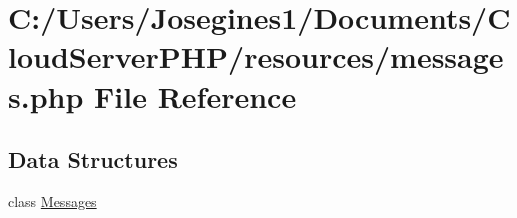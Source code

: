 \hypertarget{messages_8php}{}\section{C\+:/\+Users/\+Josegines1/\+Documents/\+Cloud\+Server\+P\+H\+P/resources/messages.php File Reference}
\label{messages_8php}
\subsection*{Data Structures}
\begin{DoxyCompactItemize}
\item 
class \mbox{\hyperlink{class_messages}{Messages}}
\end{DoxyCompactItemize}
